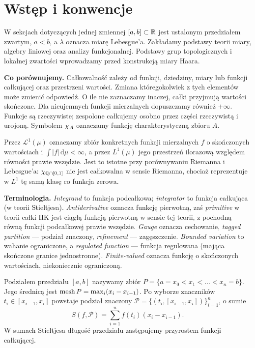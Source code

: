\section*{Wstęp i konwencje}
W sekcjach dotyczących jednej zmiennej $[a,b]\subset\mathbb R$ jest ustalonym przedziałem zwartym, $a<b$, a $\lambda$ oznacza miarę Lebesgue'a. Zakładamy podstawy teorii miary, algebry liniowej oraz analizy funkcjonalnej. Podstawy grup topologicznych i lokalnej zwartości wprowadzamy przed konstrukcją miary Haara.

\textbf{Co porównujemy.} Całkowalność zależy od funkcji, dziedziny, miary lub funkcji całkującej oraz przestrzeni wartości. Zmiana któregokolwiek z tych elementów może zmienić odpowiedź. O ile nie zaznaczamy inaczej, całki przyjmują wartości skończone. Dla nieujemnych funkcji mierzalnych dopuszczamy również $+\infty$. Funkcje są rzeczywiste; zespolone całkujemy osobno przez części rzeczywistą i urojoną. Symbolem $\chi_{A}$ oznaczamy funkcję charakterystyczną zbioru $A$.

Przez $\mathcal L^1(\mu)$ oznaczamy zbiór konkretnych funkcji mierzalnych $f$ o skończonych wartościach i $\int |f|\,\mathrm d\mu<\infty$, a przez $L^1(\mu)$ jego przestrzeń ilorazową względem równości prawie wszędzie. Jest to istotne przy porównywaniu Riemanna i Lebesgue'a: $\chi_{\mathbb Q\cap[0,1]}$ nie jest całkowalna w sensie Riemanna, chociaż reprezentuje w $L^1$ tę samą klasę co funkcja zerowa.

\textbf{Terminologia.} \emph{Integrand} to funkcja podcałkowa; \emph{integrator} to funkcja całkująca (w teorii Stieltjesa). \emph{Antiderivative} oznacza funkcję pierwotną, zaś \emph{primitive} w teorii całki HK jest ciągłą funkcją pierwotną w sensie tej teorii, z pochodną równą funkcji podcałkowej prawie wszędzie. \emph{Gauge} oznacza cechowanie, \emph{tagged partition} --- podział znaczony, \emph{refinement} --- zagęszczenie. \emph{Bounded variation} to wahanie ograniczone, a \emph{regulated function} --- funkcja regulowana (mająca skończone granice jednostronne). \emph{Finite-valued} oznacza funkcję o skończonych wartościach, niekoniecznie ograniczoną.

Podziałem przedziału $[a,b]$ nazywamy zbiór $P=\{a=x_0<x_1<\dots<x_n=b\}$. Jego średnicą jest $\operatorname{mesh} P=\max_i(x_i-x_{i-1})$. Po wyborze znaczników $t_i\in[x_{i-1},x_i]$ powstaje podział znaczony $\mathcal P=\{(t_i,[x_{i-1},x_i])\}_{i=1}^n$, o sumie
\[
S(f,\mathcal P)=\sum_{i=1}^n f(t_i)(x_i-x_{i-1}).
\]
W sumach Stieltjesa długość przedziału zastępujemy przyrostem funkcji całkującej.

